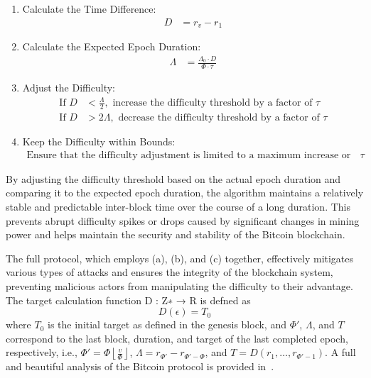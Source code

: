 \documentclass{report}
\begin{document}
\begin{enumerate}
	\item Calculate the Time Difference:
	\begin{align*}
		D &= r_v - r_1
	\end{align*}
	
	\item Calculate the Expected Epoch Duration:
	\begin{align*}
		\Lambda &= \frac{\Lambda_0 \cdot D}{\Phi \cdot \tau}
	\end{align*}
	
	\item Adjust the Difficulty:
	\begin{align*}
		\text{If } D &< \frac{\Lambda}{2}, \text{ increase the difficulty threshold by a factor of }\tau \\
		\text{If } D &> 2 \Lambda, \text{ decrease the difficulty threshold by a factor of }\tau
	\end{align*}
	
	\item Keep the Difficulty within Bounds:
	\begin{align*}
		\text{Ensure that the difficulty adjustment is limited to a maximum increase or decrease of a factor of }\tau
	\end{align*}
\end{enumerate}

By adjusting the difficulty threshold based on the actual epoch duration and comparing it to the expected epoch duration, the algorithm maintains a relatively stable and predictable inter-block time over the course of a long duration. This prevents abrupt difficulty spikes or drops caused by significant changes in mining power and helps maintain the security and stability of the Bitcoin blockchain.

The full protocol, which employs (a), (b), and (c) together, effectively mitigates various types of attacks and ensures the integrity of the blockchain system, preventing malicious actors from manipulating the difficulty to their advantage.\\
The target calculation function D : Z∗ → R is defned as
\begin{equation*}
	D(\epsilon) = T_0
\end{equation*}
where $T_0$ is the initial target as defined in the genesis block, and $\Phi'$, $\Lambda$, and $T$ correspond to the last block, duration, and target of the last completed epoch, respectively, i.e., $\Phi' = \Phi\left\lfloor\frac{v}{\Phi}\right\rfloor$, $\Lambda = r_{\Phi'} - r_{\Phi'-\Phi}$, and $T = D(r_1,\dots,r_{\Phi'-1})$. A full and beautiful analysis of the Bitcoin protocol is provided in~\cite{reference2}.
\end{document}
